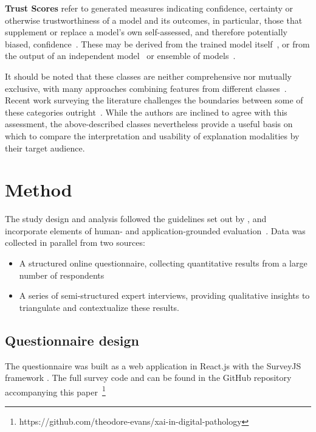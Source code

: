 \documentclass[final,5p,times,twocolumn,hyphens]{elsarticle}
\begin{document}
\textbf{Trust Scores} refer to generated measures indicating confidence, certainty or otherwise trustworthiness of a model and its outcomes, in particular, those that supplement or replace a model's own self-assessed, and therefore potentially biased, confidence~\cite{jiang2018trust, wang2021ai}. These may be derived from the trained model itself~\cite{tagasovska2019single}, or from the output of an independent model~\cite{jiang2018trust} or ensemble of models~\cite{pearce2018high}.

It should be noted that these classes are neither comprehensive nor mutually exclusive, with many approaches combining features from different classes~\cite{kim2016examples,liu2019generative}. Recent work surveying the literature challenges the boundaries between some of these categories outright~\cite{zhang2021survey}. While the authors are inclined to agree with this assessment, the above-described classes nevertheless provide a useful basis on which to compare the interpretation and usability of explanation modalities by their target audience.

\section{Method}
\label{sec:method}

The study design and analysis followed the guidelines set out by \citet{runeson_guidelines_2008}, and incorporate elements of human- and application-grounded evaluation~\cite{doshi2017towards}. Data was collected in parallel from two sources:

\begin{itemize}
    \item A structured online questionnaire, collecting quantitative results from a large number of respondents
    \item A series of semi-structured expert interviews, providing qualitative insights to triangulate and contextualize these results. 
\end{itemize}

\subsection{Questionnaire design}

The questionnaire was built as a web application in React.js with the SurveyJS framework \cite{devsoft-baltic-ou-2021}. The full survey code and can be found in the GitHub repository accompanying this paper~\footnote{https://github.com/theodore-evans/xai-in-digital-pathology}
\end{document}
